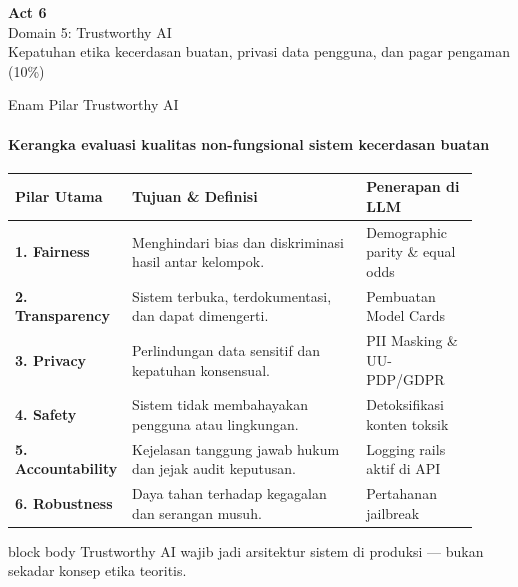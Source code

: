 \documentclass[aspectratio=169,t]{beamer}
\newcommand{\acttitle}[3]{%
  \begin{frame}[plain]
    \vspace{1.5cm}
    \begin{center}
      {\color{nvgreen}\Huge\bfseries Act #1}\\[1.2em]
      {\color{nvwhite}\Huge #2}\\[0.8em]
      {\color{nvgray}\Large #3}
    \end{center}
  \end{frame}%
}
\newcommand{\takeaway}[1]{%
  \vspace{0.1em}
  \begin{beamercolorbox}[rounded=true,shadow=false,sep=5pt]{block body}
    \centering\footnotesize\color{nvlightgreen}#1
  \end{beamercolorbox}%
}
\begin{document}
\acttitle{6}{Domain 5: Trustworthy AI}{Kepatuhan etika kecerdasan buatan, privasi data pengguna, dan pagar pengaman (10\%)}

\begin{frame}{Enam Pilar Trustworthy AI}
  \framesubtitle{Kerangka evaluasi kualitas non-fungsional sistem kecerdasan buatan}
  \begin{center}
  \renewcommand{\arraystretch}{1.0}{\footnotesize\setlength{\tabcolsep}{6pt}
  \begin{tabular}{@{}p{0.18\linewidth}p{0.50\linewidth}p{0.24\linewidth}@{}}
    \toprule \rowcolor{nvcard!50}
    \textbf{Pilar Utama} & \textbf{Tujuan \& Definisi} & \textbf{Penerapan di LLM} \\ \midrule
    \textbf{1. Fairness} & Menghindari bias dan diskriminasi hasil antar kelompok. & Demographic parity \& equal odds \\
    \textbf{2. Transparency} & Sistem terbuka, terdokumentasi, dan dapat dimengerti. & Pembuatan Model Cards \\
    \textbf{3. Privacy} & Perlindungan data sensitif dan kepatuhan konsensual. & PII Masking \& UU-PDP/GDPR \\
    \textbf{4. Safety} & Sistem tidak membahayakan pengguna atau lingkungan. & Detoksifikasi konten toksik \\
    \textbf{5. Accountability} & Kejelasan tanggung jawab hukum dan jejak audit keputusan. & Logging rails aktif di API \\
    \textbf{6. Robustness} & Daya tahan terhadap kegagalan dan serangan musuh. & Pertahanan jailbreak \\
    \bottomrule
  \end{tabular}}
  \end{center}
  \takeaway{Trustworthy AI wajib jadi arsitektur sistem di produksi --- bukan sekadar konsep etika teoritis.}
\end{frame}
\end{document}
